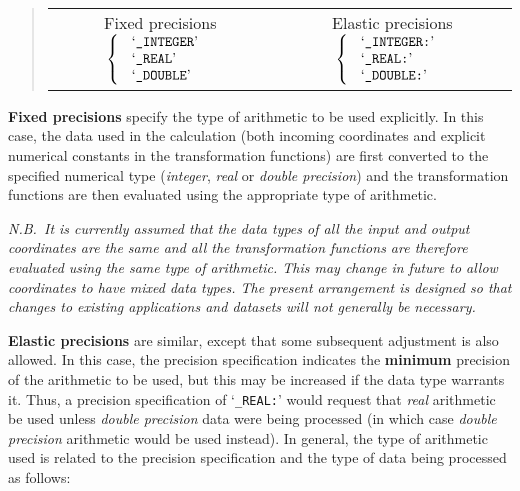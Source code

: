 \documentclass[twoside,11pt]{article}
\begin{document}
\begin{quote}
\begin{center}
\begin{tabular}{cc} 

Fixed precisions $\left\{ \mbox{
\begin{tabular}{l}
`{\tt \_INTEGER}'\\
`{\tt \_REAL}'\\
`{\tt \_DOUBLE}'
\end{tabular} } \right.$
& Elastic precisions $\left\{ \mbox{
\begin{tabular}{l}
`{\tt \_INTEGER:}'\\
`{\tt \_REAL:}'\\
`{\tt \_DOUBLE:}'
\end{tabular} } \right.$ 

\end{tabular}
\end{center}
\end{quote} 

\textbf{Fixed precisions} specify the type of arithmetic to be used explicitly.
In this case, the data used in the calculation (both incoming coordinates
and explicit numerical constants in the transformation functions) are first
converted to the specified numerical type (\emph{integer}, \emph{real} or 
\emph{ double precision}) and the transformation functions are then evaluated 
using the appropriate type of arithmetic. 

\emph{N.B.\ It is currently assumed that the data types of all the input and
output coordinates are the same and all the transformation functions are
therefore evaluated using the same type of arithmetic.
This may change in future to allow coordinates to have mixed data types. 
The present arrangement is designed so that changes to existing applications
and datasets will not generally be necessary.} 

\textbf{Elastic precisions} are similar, except that some subsequent
adjustment is also allowed.
In this case, the precision specification indicates the \textbf{minimum}
precision of the arithmetic to be used, but this may be increased if the
data type warrants it. 
Thus, a precision specification of \mbox{`{\tt \_REAL:}'} would request that
\emph{real} arithmetic be used unless \emph{double precision} data were being
processed (in which case \emph{double precision} arithmetic would be used 
instead). 
In general, the type of arithmetic used is related to the precision
specification and the type of data being processed as follows:
\end{document}
